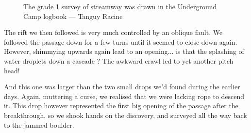 \begin{figure}[t!]
\checkoddpage \ifoddpage \forcerectofloat \else \forceversofloat \fi
\centering
{}
\caption{The grade 1 survey of \protect{} streamway was drawn in the Underground Camp logbook --- Tanguy Racine}
\label{Notebook pun too far}
\end{figure}

The rift we then followed is very much controlled by an oblique fault. We followed the passage down for a few turns until it seemed to close down again. However, shimmying upwards again lead to an opening... is that the splashing of water droplets down a cascade ? The awkward crawl led to yet another pitch head!

And this one was larger than the two small drops we'd found during the earlier days. Again, muttering a curse, we realised that we were lacking rope to descend it. This drop however represented the first big opening of the passage after the breakthrough, so we shook hands on the discovery, and surveyed all the way back to the jammed boulder.

